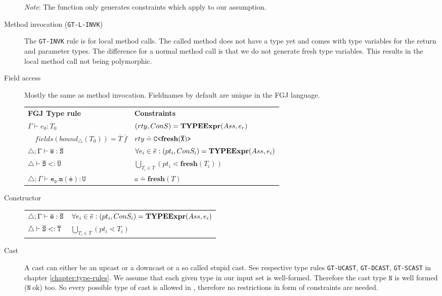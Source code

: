 \documentclass[a4paper,USenglish,cleveref, autoref, thm-restate]{lipics-v2021}
\begin{document}
\begin{description}
\textit{Note}: The \typeExpr function only generates constraints which apply to our assumption.
\item[Method invocation (\texttt{GT-L-INVK})]
The \texttt{GT-INVK} rule is for local method calls.
The called method does not have a type yet and comes with type variables for the return and parameter types.
The difference for a normal method call is that we do not generate fresh type variables.
This results in the local method call not being polymorphic.


 \item[Field access]
Mostly the same as method invocation.
Fieldnames by default are unique in the FGJ language.

 \begin{tabular}{l|l}
   \textbf{FGJ Type rule} & \textbf{Constraints} \\
   $\Gamma \vdash e_0:T_0$ & $(rty, ConS) = \textbf{TYPEExpr}(Ass, e_r)$\\ 
   $\quad \mathit{fields}(\mathit{bound}_\triangle(T_0)) = \overline{T} \ \overline{f}$ & $rty \doteq \mathtt{C \texttt{<} \textbf{fresh}(\overline{\tt X}) \texttt{>} }$ \\
  $\triangle; \Gamma \vdash \overline{\tt e} : \overline{\tt S}$ & $\forall e_i \in \overline{e} : (pt_i, ConS_i) = \textbf{TYPEExpr}(Ass, e_i)$\\
  $\triangle \vdash \overline{\tt S} <: \overline{\tt U}$ & $ \bigcup_{T_i \in \overline{T}} (pt_i \lessdot \textbf{fresh}(T_i))$\\
  $\triangle; \Gamma \vdash \mathtt{e_0.m(\overline{e}) : U }$ & $a \doteq \textbf{fresh}(T)$ \\
 \end{tabular}
 \item[Constructor]

\begin{tabular}{l|l}
  $\triangle; \Gamma \vdash \overline{\tt e} : \overline{\tt S}$ & $\forall e_i \in \overline{e} : (pt_i, ConS_i) = \textbf{TYPEExpr}(Ass, e_i)$\\
  $\triangle \vdash \overline{\tt S} <: \overline{\tt T}$ & $\bigcup_{T_i \in \overline{T}} (pt_i \lessdot T_i)$
\end{tabular}

\item[Cast]
A cast can either be an upcast or a downcast or a so called stupid cast.
See respective type rules \texttt{GT-UCAST}, \texttt{GT-DCAST}, \texttt{GT-SCAST} in chapter \ref{chapter:type-rules}.
We assume that each given type in our input set is well-formed.
Therefore the cast type $\mathtt{N}$ is well formed ($\mathtt{N}\ \text{ok}$) too.
So every possible type of cast is allowed in \TFGJ, therefore no restrictions in form of constraints are needed.

\end{description}
\end{document}
